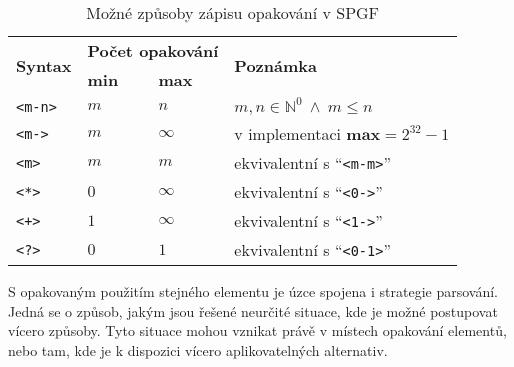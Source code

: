 \begin{table}[ht!]
	\centering
	\def\width{14mm}
	\begin{tabular}{|l|p{\width}|p{\width}|l|}
		\hline
		\multirow{2}{*}{\textbf{Syntax}} & \multicolumn{2}{c|}{\textbf{Počet opakování}} & \multirow{2}{*}{\textbf{Poznámka}}                                               \\
		\cline{2-3}
		                                 & \textbf{min}                                  & \textbf{max}                       &                                             \\
		\hline
		\texttt{<m-n>}                   & $m$                                           & $n$                                & $m,n \in \mathbb{N}^{0} \ \wedge \ m\leq n$ \\
		\hline
		\texttt{<m->}                    & $m$                                           & $\infty$                           & v implementaci $\textbf{max} = 2^{32}-1$    \\
		\hline
		\texttt{<m>}                     & $m$                                           & $m$                                & ekvivalentní s \enquote{\texttt{<m-m>}}     \\
		\hline
		\texttt{<*>}                     & $0$                                           & $\infty$                           & ekvivalentní s \enquote{\texttt{<0->}}      \\
		\hline
		\texttt{<+>}                     & $1$                                           & $\infty$                           & ekvivalentní s \enquote{\texttt{<1->}}      \\
		\hline
		\texttt{<?>}                     & $0$                                           & $1$                                & ekvivalentní s \enquote{\texttt{<0-1>}}     \\
		\hline
	\end{tabular}
	\caption{Možné způsoby zápisu opakování v SPGF}\label{tab:repeat_syntax}
\end{table}

S opakovaným použitím stejného elementu je úzce spojena i strategie parsování.
Jedná se o způsob, jakým jsou řešené neurčité situace, kde je možné postupovat vícero způsoby.
Tyto situace mohou vznikat právě v místech opakování elementů, nebo tam, kde je k dispozici vícero aplikovatelných alternativ.

